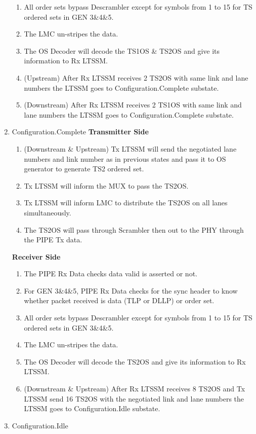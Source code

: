 \begin{enumerate}
\begin{enumerate}
  \item All order sets bypass Descrambler except for symbols from 1 to 15 for TS ordered sets in GEN 3\&4\&5.
  \item The LMC un-stripes the data.
  \item The OS Decoder will decode the TS1OS \& TS2OS and give its information to Rx LTSSM.
  \item (Upstream) After Rx LTSSM receives 2 TS2OS with same link and lane numbers the LTSSM goes to Configuration.Complete substate.
  \item (Downstream) After Rx LTSSM receives 2 TS1OS with same link and lane numbers the LTSSM goes to Configuration.Complete substate.
\end{enumerate}
\item Configuration.Complete
\newline\textbf{Transmitter Side}
\begin{enumerate}
  \item (Downstream \& Upstream) Tx LTSSM will send the negotiated lane numbers and link number as in previous states and pass it to OS generator to generate TS2 ordered set.
  \item Tx LTSSM will inform the MUX to pass the TS2OS.
  \item Tx LTSSM will inform LMC to distribute the TS2OS on all lanes simultaneously.
  \item The TS2OS will pass through Scrambler then out to the PHY through the PIPE Tx data.
\end{enumerate}
\textbf{Receiver Side}
\begin{enumerate}
  \item The PIPE Rx Data checks data valid is asserted or not.
  \item For GEN 3\&4\&5, PIPE Rx Data checks for the sync header to know whether packet received is data (TLP or DLLP) or order set.
  \item All order sets bypass Descrambler except for symbols from 1 to 15 for TS ordered sets in GEN 3\&4\&5.
  \item The LMC un-stripes the data.
  \item The OS Decoder will decode the TS2OS and give its information to Rx LTSSM.
  \item (Downstream \& Upstream) After Rx LTSSM receives 8 TS2OS and Tx LTSSM send 16 TS2OS with the negotiated link and lane numbers the LTSSM goes to Configuration.Idle substate.
\end{enumerate}
\item Configuration.Idle

\end{enumerate}
